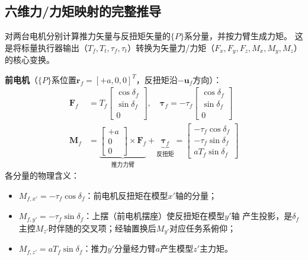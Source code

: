 \subsection{六维力/力矩映射的完整推导}

对两台电机分别计算推力矢量与反扭矩矢量的$\{P\}$系分量，并按力臂生成力矩。
这是将标量执行器输出（$T_f, T_t, \tau_f, \tau_t$）转换为矢量力/力矩（$F_x, F_y, F_z, M_x, M_y, M_z$）
的核心变换。



\textbf{前电机}（$\{P\}$系位置$\bm{r}_f=[+a,0,0]^T$，反扭矩沿$-\bm{u}_f$方向）：
\begin{align}
    \bm{F}_f &= T_f \begin{bmatrix} \cos\delta_f \\ \sin\delta_f \\ 0 \end{bmatrix},
    \quad
    \bm{\tau}_f = -\tau_f \begin{bmatrix} \cos\delta_f \\ \sin\delta_f \\ 0 \end{bmatrix}
    \label{eq:front_force} \\
    \bm{M}_f &= \underbrace{\begin{bmatrix} +a \\ 0 \\ 0 \end{bmatrix} \times \bm{F}_f}_{\text{推力力臂}}
             + \underbrace{\bm{\tau}_f}_{\text{反扭矩}}
             = \begin{bmatrix}
                 -\tau_f \cos\delta_f \\
                 -\tau_f \sin\delta_f \\
                 a T_f \sin\delta_f
               \end{bmatrix}
    \label{eq:front_moment}
\end{align}
各分量的物理含义：
\begin{itemize}
    \item $M_{f,x'}=-\tau_f\cos\delta_f$：前电机反扭矩在模型$x'$轴的分量；
    \item $M_{f,y'} = -\tau_f \sin\delta_f$：上摆（前电机摆座）使反扭矩在模型$y'$轴
          产生投影，是$\delta_f$主控$M_{z'}$时伴随的交叉项；经轴置换后$M_{y'}$对应任务系俯仰；
    \item $M_{f,z'}=aT_f\sin\delta_f$：推力$y'$分量经力臂$a$产生模型$z'$主力矩。
\end{itemize}

